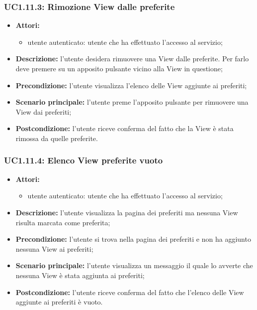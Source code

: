 \subsubsection{UC1.11.3: Rimozione View dalle preferite}
\begin{itemize}
	\item \textbf{Attori:}
	\begin{itemize}
		\item utente autenticato: utente che ha effettuato l'accesso al servizio;
	\end{itemize}
	\item \textbf{Descrizione:} l'utente desidera rimuovere una View dalle preferite. Per farlo deve premere su un apposito pulsante vicino alla View in questione;
	\item \textbf{Precondizione:} l'utente visualizza l'elenco delle View aggiunte ai preferiti;
	\item \textbf{Scenario principale:} l'utente preme l'apposito pulsante per rimuovere una View dai preferiti;
	\item \textbf{Postcondizione:} l'utente riceve conferma del fatto che la View è stata rimossa da quelle preferite.
\end{itemize}

\subsubsection{UC1.11.4: Elenco View preferite vuoto}
\begin{itemize}
	\item \textbf{Attori:}
	\begin{itemize}
		\item utente autenticato: utente che ha effettuato l'accesso al servizio;
	\end{itemize}
	\item \textbf{Descrizione:} l'utente visualizza la pagina dei preferiti ma nessuna View risulta marcata come preferita;
	\item \textbf{Precondizione:} l'utente si trova nella pagina dei preferiti e non ha aggiunto nessuna View ai preferiti;
	\item \textbf{Scenario principale:} l'utente visualizza un messaggio il quale lo avverte che nessuna View è stata aggiunta ai preferiti;
	\item \textbf{Postcondizione:} l'utente riceve conferma del fatto che l'elenco delle View aggiunte ai preferiti è vuoto.
\end{itemize}

